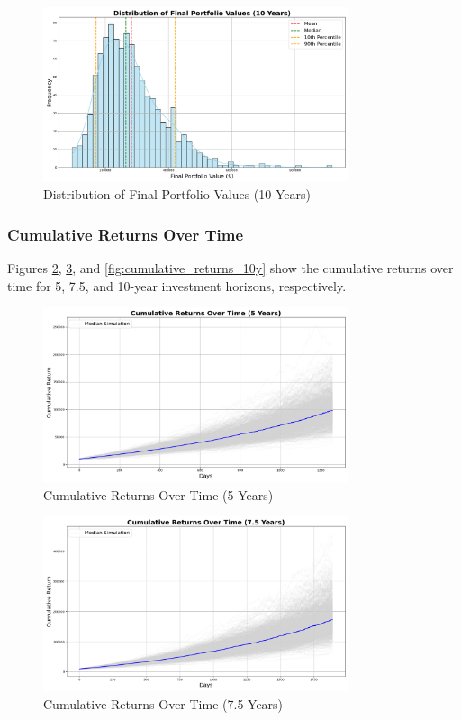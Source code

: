 \begin{figure}[!htbp]
    \centering
    \includegraphics[width=0.8\textwidth]{../Figures/final_portfolio_values_distribution_10_years.png}
    \caption{Distribution of Final Portfolio Values (10 Years)}
    \label{fig:final_portfolio_values_10y}
\end{figure}

\subsubsection{Cumulative Returns Over Time}
Figures \ref{fig:cumulative_returns_5y}, \ref{fig:cumulative_returns_7_5y}, and \ref{fig:cumulative_returns_10y} show the cumulative returns over time for 5, 7.5, and 10-year investment horizons, respectively.

\begin{figure}[!htbp]
    \centering
    \includegraphics[width=0.8\textwidth]{../Figures/cumulative_returns_over_time_5_years.png}
    \caption{Cumulative Returns Over Time (5 Years)}
    \label{fig:cumulative_returns_5y}
\end{figure}

\begin{figure}[!htbp]
    \centering
    \includegraphics[width=0.8\textwidth]{../Figures/cumulative_returns_over_time_7_5_years.png}
    \caption{Cumulative Returns Over Time (7.5 Years)}
    \label{fig:cumulative_returns_7_5y}
\end{figure}

